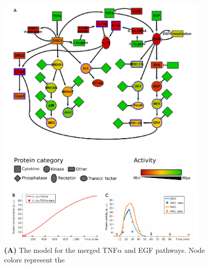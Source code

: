 \documentclass{bmcart}
\begin{document}
\begin{backmatter}
\def\largeModelScale{0.18}%
\def\legendScalaColori{0.21}%
\def\legendScalaForme{0.21}%
\def\scalaGrafici{0.0709}%
\begin{figure}[!htpb]
\centering
  \includegraphics[width=0.9\textwidth]{images/large_network_merged_no_hypotheses_oneImage}
\caption{
{\bf(A)} %
The model for the merged TNF$\alpha$ and EGF pathways. Node colors represent the
}
\end{figure}
\end{backmatter}
\end{document}
